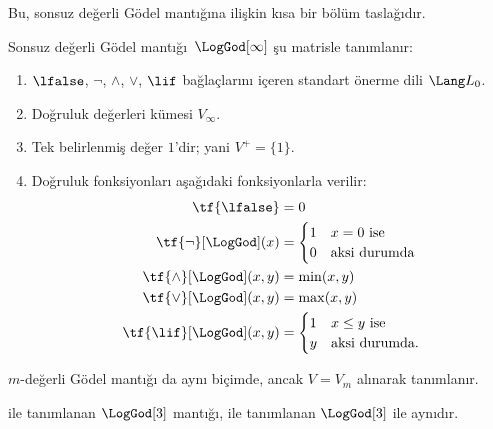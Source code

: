 



\begin{editorial}
  Bu, sonsuz değerli G\"odel mantığına ilişkin kısa bir bölüm taslağıdır.
\end{editorial}

\begin{defn} Sonsuz değerli G\"odel
mantığı~$\LogGod[\infty]$ şu matrisle tanımlanır:
\begin{enumerate}
  \item $\lfalse$, $\lnot$, $\land$, $\lor$, $\lif$ bağlaçlarını içeren
  standart önerme dili $\Lang L_0$.
  \item Doğruluk değerleri kümesi $V_\infty$.
  \item Tek belirlenmiş değer $1$'dir; yani $V^+ = \{1\}$.
  \item Doğruluk fonksiyonları aşağıdaki fonksiyonlarla verilir:
  \begin{align*}
    \tf{\lfalse} & = 0\\
    \tf{\lnot}[\LogGod](x) & = \begin{cases}
      1 & \text{$x = 0$ ise}\\
      0 & \text{aksi durumda}
    \end{cases}\\
    \tf{\land}[\LogGod](x,y) & = \min(x,y)\\
    \tf{\lor}[\LogGod](x,y) & = \max(x,y)\\
    \tf{\lif}[\LogGod](x,y) & = \begin{cases}
      1 & \text{$x \le y$ ise}\\
      y & \text{aksi durumda.}
    \end{cases}
    \end{align*}
\end{enumerate}
$m$-değerli G\"odel mantığı da aynı biçimde, ancak $V = V_m$ alınarak
tanımlanır.
\end{defn}

\begin{prop}
   ile tanımlanan $\LogGod[3]$ mantığı,
   ile tanımlanan $\LogGod[3]$ ile aynıdır.
\end{prop}

